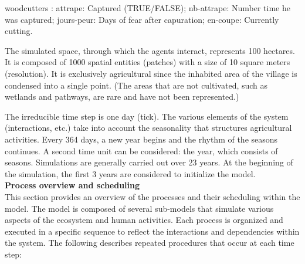 \documentclass{article}
\begin{document}
        woodcutters : attrape: Captured (TRUE/FALSE); nb-attrape: Number time he was captured; jours-peur: Days of fear after capuration; en-coupe: Currently cutting.


        The simulated space, through which the agents interact, represents 100 hectares. It is composed of 1000 spatial entities (patches) with a size of 10 square meters (resolution). It is exclusively agricultural since the inhabited area of the village is condensed into a single point. (The areas that are not cultivated, such as wetlands and pathways, are rare and have not been represented.)

        The irreducible time step is one day (tick). The various elements of the system (interactions, etc.) take into account the seasonality that structures agricultural activities. Every 364 days, a new year begins and the rhythm of the seasons continues. A second time unit can be considered: the year, which consists of seasons. Simulations are generally carried out over 23 years. At the beginning of the simulation, the first 3 years are considered to initialize the model.\\
    
        \textbf{Process overview and scheduling}\\

        This section provides an overview of the processes and their scheduling within the model. The model is composed of several sub-models that simulate various aspects of the ecosystem and human activities. Each process is organized and executed in a specific sequence to reflect the interactions and dependencies within the system. The following describes repeated procedures that occur at each time step:
\end{document}
